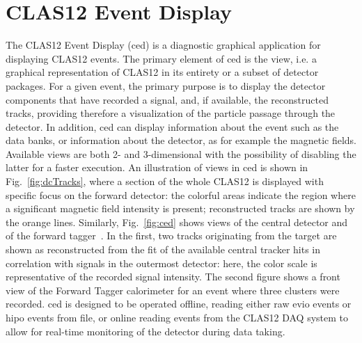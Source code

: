 \section{CLAS12 Event Display}\label{sec:ced}
The CLAS12 Event Display (ced) is a diagnostic graphical application for displaying CLAS12 events.
The primary element of ced is the view, i.e. a graphical representation of CLAS12 in its
entirety or a subset of detector packages.  For a given event, the primary purpose is to display the detector components that have recorded a signal, and, if available, the reconstructed tracks, providing therefore a visualization of the particle passage through the detector. In addition, ced can display information about the event such as the data banks, or information about the detector, as for example the magnetic fields. Available views are both 2- and 3-dimensional with the possibility of disabling the latter for a faster execution. An illustration of views in ced is shown in Fig.~\ref{fig:dcTracks}, where a section of the whole CLAS12 is displayed with specific focus on the forward detector: the colorful areas indicate the region where a significant magnetic field intensity is present; reconstructed tracks are shown by the orange lines. Similarly, Fig.~\ref{fig:ced} shows views of the central detector and of the forward tagger~\cite{ft-nim}. In the first, two tracks originating from the target are shown as reconstructed from the fit of the available central tracker hits in correlation with signals in the outermost detector: here, the color scale is representative of the recorded signal intensity. The second figure shows a front view of the Forward Tagger calorimeter for an event where three clusters were recorded.
ced is designed to be operated offline, reading either raw evio events or hipo events from file, or online reading events from the CLAS12 DAQ system \cite{daq-nim} to allow for real-time monitoring of the detector during data taking.
 
